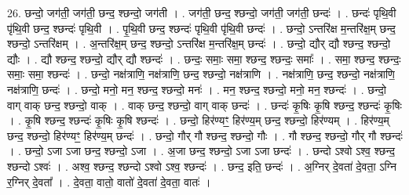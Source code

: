 \documentclass[17pt]{extarticle}
\begin{document}
26. छन्दो॒ जग॑ती॒ जग॑ती॒ छन्द॒ श्छन्दो॒ जग॑ती । . जग॑ती॒ छन्द॒ श्छन्दो॒ जग॑ती॒ जग॑ती॒ छन्दः॑ । . छन्दः॑ पृथि॒वी पृ॑थि॒वी छन्द॒ श्छन्दः॑ पृथि॒वी । . पृ॒थि॒वी छन्द॒ श्छन्दः॑ पृथि॒वी पृ॑थि॒वी छन्दः॑ । . छन्दो॒ ऽन्तरि॑क्ष म॒न्तरि॑क्ष॒म् छन्द॒ श्छन्दो॒ ऽन्तरि॑क्षम् । . अ॒न्तरि॑क्ष॒म् छन्द॒ श्छन्दो॒ ऽन्तरि॑क्ष म॒न्तरि॑क्ष॒म् छन्दः॑ । . छन्दो॒ द्यौर् द्यौ श्छन्द॒ श्छन्दो॒ द्यौः । . द्यौ श्छन्द॒ श्छन्दो॒ द्यौर् द्यौ श्छन्दः॑ । . छन्दः॒ समाः॒ समा॒ श्छन्द॒ श्छन्दः॒ समाः᳚ । . समा॒ श्छन्द॒ श्छन्दः॒ समाः॒ समा॒ श्छन्दः॑ । . छन्दो॒ नक्ष॑त्राणि॒ नक्ष॑त्राणि॒ छन्द॒ श्छन्दो॒ नक्ष॑त्राणि । . नक्ष॑त्राणि॒ छन्द॒ श्छन्दो॒ नक्ष॑त्राणि॒ नक्ष॑त्राणि॒ छन्दः॑ । . छन्दो॒ मनो॒ मन॒ श्छन्द॒ श्छन्दो॒ मनः॑ । . मन॒ श्छन्द॒ श्छन्दो॒ मनो॒ मन॒ श्छन्दः॑ । . छन्दो॒ वाग् वाक् छन्द॒ श्छन्दो॒ वाक् । . वाक् छन्द॒ श्छन्दो॒ वाग् वाक् छन्दः॑ । . छन्दः॑ कृ॒षिः कृ॒षि श्छन्द॒ श्छन्दः॑ कृ॒षिः । . कृ॒षि श्छन्द॒ श्छन्दः॑ कृ॒षिः कृ॒षि श्छन्दः॑ । . छन्दो॒ हिर॑ण्यꣳ॒॒ हिर॑ण्य॒म् छन्द॒ श्छन्दो॒ हिर॑ण्यम् । . हिर॑ण्य॒म् छन्द॒ श्छन्दो॒ हिर॑ण्यꣳ॒॒ हिर॑ण्य॒म् छन्दः॑ । . छन्दो॒ गौर् गौ श्छन्द॒ श्छन्दो॒ गौः । . गौ श्छन्द॒ श्छन्दो॒ गौर् गौ श्छन्दः॑ । . छन्दो॒ ऽजा ऽजा छन्द॒ श्छन्दो॒ ऽजा । . अ॒जा छन्द॒ श्छन्दो॒ ऽजा ऽजा छन्दः॑ । . छन्दो ऽश्वो ऽश्व॒ श्छन्द॒ श्छन्दो ऽश्वः॑ । . अश्व॒ श्छन्द॒ श्छन्दो ऽश्वो ऽश्व॒ श्छन्दः॑ । . छन्द॒ इति॒ छन्दः॑ । . अ॒ग्निर् दे॒वता॑ दे॒वता॒ ऽग्नि र॒ग्निर् दे॒वता᳚ । . दे॒वता॒ वातो॒ वातो॑ दे॒वता॑ दे॒वता॒ वातः॑ । \newline
\end{document}
